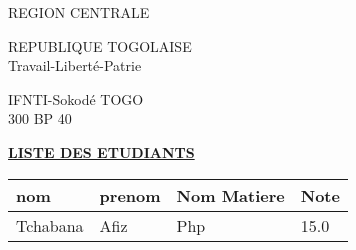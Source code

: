 \documentclass[10pt,a4paper]{article}
\begin{document}
\begin{minipage}{12cm}
\textsf{REGION CENTRALE} \\ \hspace{1cm}
\end{minipage}
\begin{minipage}{5cm}
REPUBLIQUE TOGOLAISE\\
Travail-Liberté-Patrie
\end{minipage}
\begin{minipage}{3cm}
\begin{center}
IFNTI-Sokodé TOGO\\300 BP 40
\end{center}
\end{minipage}
\begin{center}
\underline{\textbf{LISTE DES ETUDIANTS}}
\end{center}
\begin{longtable}{|l|l|l|l|} \hline
\textbf{nom} & \textbf{prenom} & \textbf{Nom Matiere} &
\textbf{Note} \\ \hline


Tchabana & Afiz & Php &  15.0 \\ \hline



\end{longtable}
\end{document}
